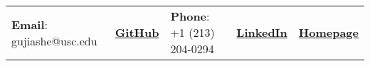 \documentclass[letterpaper, 11pt]{article}
\begin{document}


\vspace{0.5cm} 
\begin{center}
\begin{tabular}{lllll}
\textbf{Email}: gujiashe@usc.edu      &
 \href{https://github.com/jiashenggu}{\textbf{GitHub}}    &
 \textbf{Phone}: +1 (213) 204-0294   & 
 \href{https://www.linkedin.com/in/jiasheng-gu/}{\textbf{LinkedIn}} &
 \href{https://jiashenggu.github.io/}{\textbf{Homepage}} 
\end{tabular}
\end{center}


\setlength{\tabcolsep}{8pt}
\end{document}
